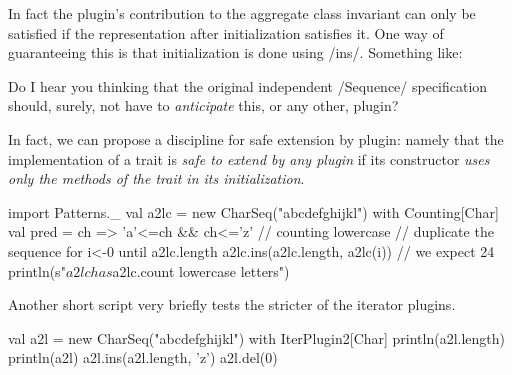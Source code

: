 \documentclass{ip3}
\begin{document}
\begin{foil}
\begin{exercise}
\begin{answer}
In fact the plugin's contribution to the aggregate class invariant can only
be satisfied if the representation after initialization satisfies it. One
way of guaranteeing this is that initialization is done using
\sc/ins/. Something like:

\begin{--scala}
     private var rep = List()
     locally { for { pos <- 0..initial.length } ins(pos, initial(pos)) 
\end{--scala}

Do I hear you thinking that the original independent \sc/Sequence/ specification should,
surely, not have to \textit{anticipate} this, or any other, plugin?  

In fact, we can propose a discipline for safe extension by plugin: namely
that the implementation of a trait is \textit{safe to extend by any plugin}
if its constructor \textit{uses only the methods of the trait in its
initialization}. 
\begin{--code}[Patterns.sc]
import Patterns._
val a2lc = new CharSeq("abcdefghijkl") with Counting[Char] {
    val pred = { ch => 'a'<=ch && ch<='z'} // counting lowercase
}
// duplicate the sequence
for { i<-0 until a2lc.length } a2lc.ins(a2lc.length, a2lc(i))
// we expect 24
println(s"$a2lc has ${a2lc.count} lowercase letters")
\end{--code}

Another short script very briefly tests the stricter of the iterator plugins.
\begin{--code}
val a2l = new CharSeq("abcdefghijkl") with IterPlugin2[Char]
println(a2l.length)
println(a2l)
a2l.ins(a2l.length, 'z')
a2l.del(0)


\end{--code}
\end{answer}
\end{exercise}
\end{foil}
\end{document}
